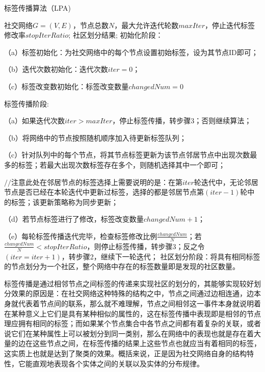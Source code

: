 \begin{algorithm}[htb]  
  \caption{标签传播算法（LPA)}  
  \label{alg:LPA}  
  \begin{algorithmic}[1]  
    \Require
      社交网络$G=(V,E)$，节点总数$N$，最大允许迭代轮数$maxIter$，停止迭代标签修改率$stopIterRatio$;  
    \Ensure  
      社区划分结果;  
    \State  初始化阶段：

    （a）标签初始化：为社交网络中的每个节点设置初始标签，设为其节点ID即可；

    （b）迭代次数初始化：迭代次数$iter = 0$；

    （c）标签改变数初始化：标签改变数量$changedNum = 0$

    \State  标签传播阶段:
      
    （a）如果迭代次数$iter > maxIter$，停止标签传播，转步骤3；否则继续算法；
    
    （b）将网络中的节点按照随机顺序加入待更新标签队列；
    
    （c）针对队列中的每个节点，将其节点标签更新为该节点邻居节点中出现次数最多的标签；若最大出现次数标签存在多个，则随机选择其中一个即可；
    
    $//$注意此处在邻居节点的标签选择上需要说明的是：在第$iter$轮迭代中，无论邻居节点是否已经在本轮迭代中更新过标签，选择的都是邻居节点第$(iter - 1)$轮中的标签；该更新策略称为同步更新；
    
    （d）若节点标签进行了修改，标签改变数量$changedNum + 1$；
    
    （e）每轮标签传播迭代完毕，检查标签修改比例$\frac{changedNum}{N}$；若$\frac{changedNum}{N} < stopIterRatio$，则停止标签传播，转步骤3；反之令$(iter = iter+ 1)$，转步骤2，继续下一轮迭代；
    \State  社区划分阶段：将具有相同标签的节点划分为一个社区，整个网络中存在的标签数量即是发现的社区数量。
  \end{algorithmic}  
\end{algorithm} 

标签传播是通过相邻节点之间标签的传递来实现社区的划分的，其能够实现较好划分效果的原因是：在社交网络这种特殊的结构之中，节点之间通过边相连通，边本身就代表着节点间的联系，那么就不难理解，节点之间相邻这一事件本身就说明着在某种意义上它们是具有某种相似的属性的，这在标签传播中表现即是相邻的节点理应拥有相同的标签；而如果某个节点集合中各节点之间都有着复杂的关联，或者说它们在某种属性上可以被划分到同一类别，那么在网络中的表现也就是存在着大量的边在这些节点之间，在标签传播的结果上这些节点也就应当有着相同的标签，这实质上也就是达到了聚类的效果。概括来说，正是因为社交网络自身的结构特性，它能直观地表现各个实体之间的关联以及实体的分布规律。

